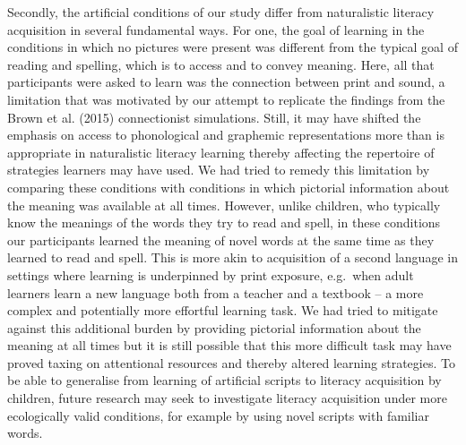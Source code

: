 \documentclass[doc,floatsintext]{apa6}
\begin{document}
Secondly, the artificial conditions of our study differ from
naturalistic literacy acquisition in several fundamental ways. For one,
the goal of learning in the conditions in which no pictures were present
was different from the typical goal of reading and spelling, which is to
access and to convey meaning. Here, all that participants were asked to
learn was the connection between print and sound, a limitation that was
motivated by our attempt to replicate the findings from the Brown et al.
(2015) connectionist simulations. Still, it may have shifted the
emphasis on access to phonological and graphemic representations more
than is appropriate in naturalistic literacy learning thereby affecting
the repertoire of strategies learners may have used. We had tried to
remedy this limitation by comparing these conditions with conditions in
which pictorial information about the meaning was available at all
times. However, unlike children, who typically know the meanings of the
words they try to read and spell, in these conditions our participants
learned the meaning of novel words at the same time as they learned to
read and spell. This is more akin to acquisition of a second language in
settings where learning is underpinned by print exposure, e.g.~when
adult learners learn a new language both from a teacher and a textbook
-- a more complex and potentially more effortful learning task. We had
tried to mitigate against this additional burden by providing pictorial
information about the meaning at all times but it is still possible that
this more difficult task may have proved taxing on attentional resources
and thereby altered learning strategies. To be able to generalise from
learning of artificial scripts to literacy acquisition by children,
future research may seek to investigate literacy acquisition under more
ecologically valid conditions, for example by using novel scripts with
familiar words.
\end{document}
